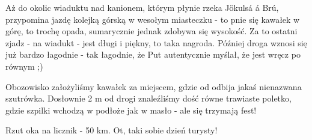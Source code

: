 Aż do okolic wiaduktu nad kanionem, którym płynie rzeka Jökulsá á Brú,  przypomina jazdę kolejką górską w wesołym miasteczku - to pnie się kawałek w górę, to trochę opada, sumarycznie jednak zdobywa się wysokość. Za to ostatni zjadz - na wiadukt - jest długi i piękny, to taka nagroda. Później droga wznosi się już bardzo łagodnie - tak łagodnie, że Put autentycznie myślał, że jest wręcz po równym ;)

Obozowisko założyliśmy kawałek za miejscem, gdzie od  odbija jakaś nienazwana szutrówka. Dosłownie 2 m od drogi znaleźliśmy dość równe trawiaste poletko, gdzie szpilki wchodzą w podłoże jak w masło - ale się trzymają fest!

Rzut oka na licznik - 50 km. Ot, taki sobie dzień turysty!
